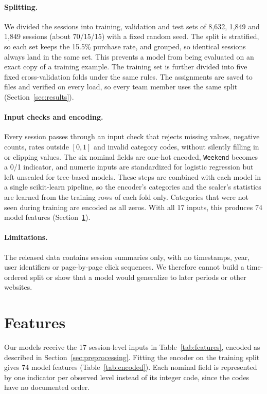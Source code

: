 \documentclass[11pt]{article}
\begin{document}
\paragraph{Splitting.} We divided the sessions into training, validation and
test sets of 8,632, 1,849 and 1,849 sessions (about 70/15/15) with a fixed
random seed. The split is stratified, so each set keeps the 15.5\% purchase
rate, and grouped, so identical sessions always land in the same set. This
prevents a model from being evaluated on an exact copy of a training example.
The training set is further divided into five fixed cross-validation folds
under the same rules. The assignments are saved to files and verified on
every load, so every team member uses the same split
(Section~\ref{sec:results}).

\paragraph{Input checks and encoding.} Every session passes through an input
check that rejects missing values, negative counts, rates outside $[0, 1]$
and invalid category codes, without silently filling in or clipping values.
The six nominal fields are one-hot encoded, \texttt{Weekend} becomes a 0/1
indicator, and numeric inputs are standardized for logistic regression but
left unscaled for tree-based models. These steps are combined with each model
in a single scikit-learn pipeline, so the encoder's categories and the
scaler's statistics are learned from the training rows of each fold only.
Categories that were not seen during training are encoded as all zeros. With
all 17 inputs, this produces 74 model features (Section~\ref{sec:features}).

\paragraph{Limitations.} The released data contains session summaries only,
with no timestamps, year, user identifiers or page-by-page click sequences.
We therefore cannot build a time-ordered split or show that a model would
generalize to later periods or other websites.

\section{Features}
\label{sec:features}

Our models receive the 17 session-level inputs in Table~\ref{tab:features},
encoded as described in Section~\ref{sec:preprocessing}. Fitting the encoder
on the training split gives 74 model features (Table~\ref{tab:encoded}). Each
nominal field is represented by one indicator per observed level instead of
its integer code, since the codes have no documented order.
\end{document}
